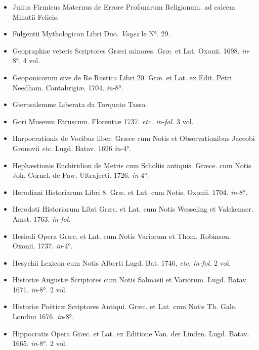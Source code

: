 \documentclass[a4paper, 11pt, oneside, polutonikogreek, french]{article}
\begin{document}
\begin{itemize}
    \item Juiius Firmicus Maternus de Errore Profanarum Religionum. ad calcem Minutii Felicis.

    \item Fulgentii Mythologicon Libri Duo. \emph{Voyez} le N°. 29.

    \item Geopraphiæ veteris Scriptores Græci minores. Græ. et Lat. Oxonii. 1698. \emph{in}-8°. 4 vol.

    \item Geoponicorum sive de Re Rustica Libri 20. Græ. et Lat. ex Edit. Petri Needham. Cantabrigiæ. 1704. \emph{in}-8°.

    \item Gierusalemme Liberata da Torquato Tasso.

    \item Gori Museum Etruscum. Florentiæ 1737. \emph{etc. in-fol.} 3 vol.

    \item Harpocrationis de Vocibus liber. Græce cum Notis et Observationibus Jaccobi Gronovii \emph{etc.} Lugd. Batav. 1696 \emph{in}-4°.

    \item Hephæstionis Enchiridion de Metris cum Scholiis antiquis. Græce. cum Notis Joh. Cornel. de Paw. Ultrajecti. 1726. \emph{in}-4°.

    \item Herodiani Historiarum Libri 8. Græ. et Lat. cum Notis. Oxonii. 1704. \emph{in}-8°.

    \item Herodoti Historiarum Libri Græc. et Lat. cum Notis Wesseling et Valckenaer. Amst. 1763. \emph{in-fol.}

    \item Hesiodi Opera Græc. et Lat. cum Notis Variorum et Thom. Robinson. Oxonii. 1737. \emph{in}-4°.

    \item Hesychii Lexicon cum Notis Alberti Lugd. Bat. 1746, \emph{etc.} \emph{in-fol.} 2 vol.

    \item Historiæ Augustæ Scriptores cum Notis Salmasii et Variorum. Lugd. Batav. 1671. \emph{in}-8°. 2 vol.

    \item Historiæ Poëticæ Scriptores Antiqui. Græc. et Lat. cum Notis Th. Gale. Londini 1676. \emph{in}-8°.

    \item Hippocratis Opera Græc. et Lat. ex Editione Van. der Linden. Lugd. Batav. 1665. \emph{in}-8°. 2 vol.


\end{itemize}
\end{document}

